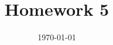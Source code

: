 




\documentclass[11pt, a4paper, UTF8]{ctexart}
\usepackage{tikz}
\usetikzlibrary{shapes.geometric, arrows}



\title{Homework 5}
\date{\today}


\thispagestyle{empty}
\maketitle

